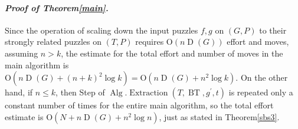 \documentclass[letter,11pt]{article}
\newcommand{\white}{\qquad{\framebox{\rule{0pt}{4pt}}}}
\newcommand{\owari}{\hfill\white}
\theoremstyle{definition}
\theoremstyle{definition}
\DeclareMathOperator{\BT}{BT}
\DeclareMathOperator{\Alg}{Alg}
\DeclareMathOperator{\Extraction}{Extraction}
\DeclareMathOperator{\D}{D}
\newcommand{\1}{\boldmath$~1~$\unboldmath}
\newcommand{\Ord}{\mathrm{O}}
\newcommand{\qedgo}{\vspace{0.35cm}}
\newcommand{\tume}{\hspace*{0.2em}}
\newcommand{\maru}[1]{{\ooalign{\hfill$\small#1$\hfill\crcr\scalebox{1.3}{$\bigcirc$}}}}
\newenvironment{Proofof}[1]{\expandafter
\paragraph{{\it Proof of #1.}}}{\hspace{5mm}\owari\qedgo}
\begin{document}
\begin{Proofof}{Theorem\tume\ref{main}}
Since the operation of scaling down the input puzzles $f,g$ on $(G,P)$ to their strongly related puzzles on $(T,P)$ requires $\Ord(n\D(G))$ effort and moves, assuming $n > k$, the estimate for the total effort and number of moves in the main algorithm is $\Ord(n\D(G) +(n+k)^2 \log k)=\Ord(n\D(G)+n^2 \log k)$.
On the other hand, if $n \leq k$, then Step\tume\maru{\ref{mini-puzzle-finish}} of $\Alg.\Extraction(T, \BT,g^{\prime},t)$ is repeated only a constant number of times for the entire main algorithm, so the total effort estimate is $\Ord(N+n\D(G) + n^2\log n)$, just as stated in Theorem\tume\ref{sbs3}.


\end{Proofof}
\end{document}
